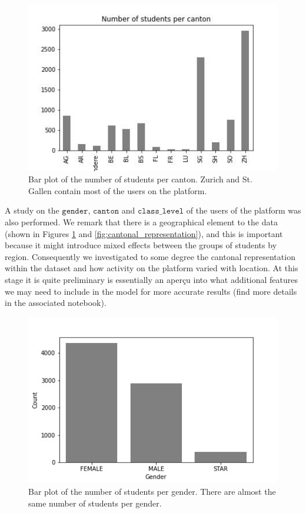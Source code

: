 \documentclass[sigplan,screen]{acmart}
\begin{document}
\begin{figure}[h]
    \centering
    \includegraphics[width=\linewidth]{reports/figures/num_per_canton.jpg}
    \caption{Bar plot of the number of students per canton. Zurich and St. Gallen contain most of the users on the platform.}
    \label{fig:my_label}
\end{figure}

A study on the $\texttt{gender}$, $\texttt{canton}$ and $\texttt{class\_level}$ of the users of the platform was also performed. We remark that there is a geographical element to the data (shown in Figures \ref{fig:my_label} and \ref{fig:cantonal_representation}), and this is important because it might introduce mixed effects between the groups of students by region. Consequently we investigated to some degree the cantonal representation within the dataset and how activity on the platform varied with location. At this stage it is quite preliminary is essentially an aperçu into what additional features we may need to include in the model for more accurate results (find more details in the associated notebook).

\begin{figure}[h]
    \centering
    \includegraphics[width=\linewidth]{reports/figures/num_per_gender.jpg}
    \caption{Bar plot of the number of students per gender. There are almost the same number of students per gender.}
    \label{fig:gender}
\end{figure}
\end{document}
